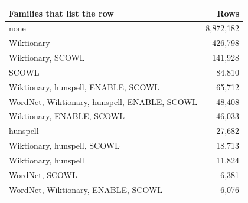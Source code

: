 \begin{tabular}{lr}
\toprule
Families that list the row & Rows \\
\midrule
none & 8,872,182 \\
Wiktionary & 426,798 \\
Wiktionary, SCOWL & 141,928 \\
SCOWL & 84,810 \\
Wiktionary, hunspell, ENABLE, SCOWL & 65,712 \\
WordNet, Wiktionary, hunspell, ENABLE, SCOWL & 48,408 \\
Wiktionary, ENABLE, SCOWL & 46,033 \\
hunspell & 27,682 \\
Wiktionary, hunspell, SCOWL & 18,713 \\
Wiktionary, hunspell & 11,824 \\
WordNet, SCOWL & 6,381 \\
WordNet, Wiktionary, ENABLE, SCOWL & 6,076 \\
\bottomrule
\end{tabular}
